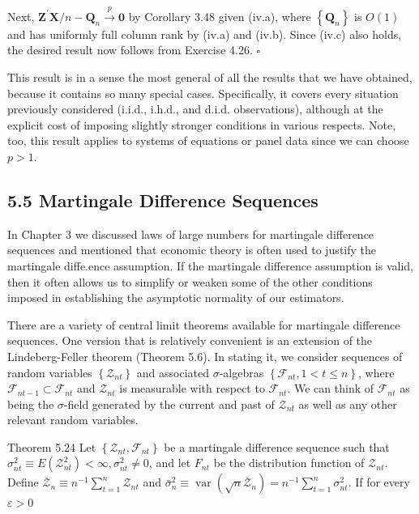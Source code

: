 \documentclass[10pt]{article}
\begin{document}
Next, $\mathbf{Z}^{\prime} \mathbf{X} / n-\mathbf{Q}_{n} \xrightarrow{p} \mathbf{0}$ by Corollary 3.48 given (iv.a), where $\left\{\mathbf{Q}_{n}\right\}$ is $O(1)$ and has uniformly full column rank by (iv.a) and (iv.b). Since (iv.c) also holds, the desired result now follows from Exercise 4.26. \(\square\)

This result is in a sense the most general of all the results that we have obtained, because it contains so many special cases. Specifically, it covers every situation previously considered (i.i.d., i.h.d., and d.i.d. observations), although at the explicit cost of imposing slightly stronger conditions in various respects. Note, too, this result applies to systems of equations or panel data since we can choose $p>1$.

\subsection*{5.5 Martingale Difference Sequences}
In Chapter 3 we discussed laws of large numbers for martingale difference sequences and mentioned that economic theory is often used to justify the martingale diffe.ence assumption. If the martingale difference assumption is valid, then it often allows us to simplify or weaken some of the other conditions imposed in establishing the asymptotic normality of our estimators.

There are a variety of central limit theorems available for martingale difference sequences. One version that is relatively convenient is an extension of the Lindeberg-Feller theorem (Theorem 5.6). In stating it, we consider sequences of random variables $\left\{\mathcal{Z}_{n t}\right\}$ and associated $\sigma$-algebras $\left\{\mathcal{F}_{n t}, 1<t \leq n\right\}$, where $\mathcal{F}_{n t-1} \subset \mathcal{F}_{n t}$ and $\mathcal{Z}_{n t}$ is measurable with respect to $\mathcal{F}_{n t}$. We can think of $\mathcal{F}_{n t}$ as being the $\sigma$-field generated by the current and past of $\mathcal{Z}_{n t}$ as well as any other relevant random variables.

Theorem 5.24 Let $\left\{\mathcal{Z}_{n t}, \mathcal{F}_{n t}\right\}$ be a martingale difference sequence such that $\sigma_{n t}^{2} \equiv E\left(\mathcal{Z}_{n t}^{2}\right)<\infty, \sigma_{n t}^{2} \neq 0$, and let $F_{n t}$ be the distribution function of $\mathcal{Z}_{n t}$. Define $\overline{\mathcal{Z}}_{n} \equiv n^{-1} \sum_{t=1}^{n} \mathcal{Z}_{n t}$ and $\bar{\sigma}_{n}^{2} \equiv \operatorname{var}\left(\sqrt{n} \overline{\mathcal{Z}}_{n}\right)=n^{-1} \sum_{t=1}^{n} \sigma_{n t}^{2}$. If for every $\varepsilon>0$
\end{document}

